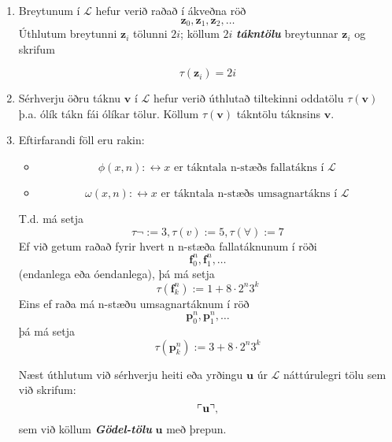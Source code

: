 \documentclass[12pt]{book}
\newcommand{\cL}{\mathcal{L}}
\newcommand{\mb}[1]{\mathbf{#1}}
\newcommand{\bz}{\mathbf{z}}
\newcommand{\bu}{\mathbf{u}}
\newcommand{\bv}{\mathbf{v}}
\newcommand{\emphs}[1]{\textbf{\emph{#1}}}
\DeclarePairedDelimiter{\god}{\ulcorner}{\urcorner}
\begin{document}
\begin{enumerate}[(1)]
\item Breytunum í $\cL$ hefur verið raðað í ákveðna röð
  \[ \bz_0, \bz_1, \bz_2, \dotsc\]
  Úthlutum breytunni $\bz_i$ tölunni $2i$; köllum $2i$
  \emphs{tákntölu} breytunnar $\bz_i$ og skrifum
 
  \[\tau(\bz_i) = 2i\]
\item Sérhverju öðru táknu $\bv$ í $\cL$ hefur verið úthlutað
  tiltekinni oddatölu $\tau(\bv)$ þ.a. ólík tákn fái ólíkar tölur.
  Köllum $\tau(\bv)$ tákntölu táknsins $\bv$.
\item Eftirfarandi föll eru rakin:
  \begin{itemize}
  \item \[\phi(x,n): \leftrightarrow x \text{ er tákntala n-stæðs fallatákns  í } \cL\]
  \item \[\omega(x,n): \leftrightarrow x \text{ er tákntala n-stæðs umsagnartákns í } \cL\]
  \end{itemize}

  \begin{ath}
   T.d. má setja 
   \[ \tau{\lnot} := 3, \tau(v) := 5, \tau(\forall) := 7 \]
   Ef við getum raðað fyrir hvert n n-stæða fallatáknunum í röði
   \[\mb{f}_0^n, \mb{f}_1^n, \dotsc \]
   (endanlega eða óendanlega), þá má setja
   \[ \tau(\mb{f}_k^n) := 1 + 8\cdot 2^n 3^k \]
   Eins ef raða má n-stæðu umsagnartáknum í röð
   \[\mb{p}_0^n, \mb{p}_1^n, \dotsc \]
   þá má setja
   \[ \tau(\mb{p}_k^n) :=3 + 8\cdot 2^n 3^k \]

   Næst úthlutum við sérhverju heiti eða
   yrðingu $\bu$ úr $\cL$ náttúrulegri tölu
   sem við skrifum:
   \[ \god{\bu}, \]
   sem við köllum \emphs{Gödel-tölu} $\bu$
   með þrepun.
  \end{ath}
\end{enumerate}
\end{document}
